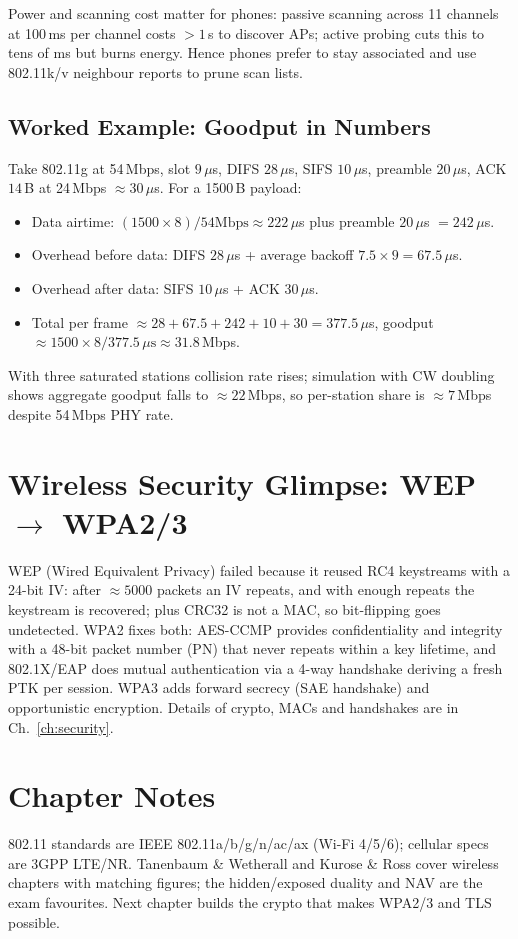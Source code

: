 Power and scanning cost matter for phones: passive scanning across 11 channels at 100\,ms per channel costs $>1$\,s to discover APs; active probing cuts this to tens of ms but burns energy. Hence phones prefer to stay associated and use 802.11k/v neighbour reports to prune scan lists.

\subsection{Worked Example: Goodput in Numbers}
Take 802.11g at 54\,Mbps, slot $9\,\mu$s, DIFS $28\,\mu$s, SIFS $10\,\mu$s, preamble $20\,\mu$s, ACK $14$\,B at 24\,Mbps $\approx 30\,\mu$s. For a 1500\,B payload:
\begin{itemize}[itemsep=0.25em]
    \item Data airtime: $(1500\times8)/54\text{Mbps}\approx 222\,\mu$s plus preamble $20\,\mu$s $=242\,\mu$s.
    \item Overhead before data: DIFS $28\,\mu$s + average backoff $7.5\times9=67.5\,\mu$s.
    \item Overhead after data: SIFS $10\,\mu$s + ACK $30\,\mu$s.
    \item Total per frame $\approx 28+67.5+242+10+30=377.5\,\mu$s, goodput $\approx 1500\times8/377.5\,\mu\text{s}\approx 31.8$\,Mbps.
\end{itemize}
With three saturated stations collision rate rises; simulation with CW doubling shows aggregate goodput falls to $\approx 22$\,Mbps, so per-station share is $\approx 7$\,Mbps despite 54\,Mbps PHY rate.

\section{Wireless Security Glimpse: WEP \texorpdfstring{$\to$}{to} WPA2/3}\label{sec:wireless-sec}
WEP (Wired Equivalent Privacy) failed because it reused RC4 keystreams with a 24-bit IV: after $\approx 5000$ packets an IV repeats, and with enough repeats the keystream is recovered; plus CRC32 is not a MAC, so bit-flipping goes undetected. WPA2 fixes both: AES-CCMP provides confidentiality and integrity with a 48-bit packet number (PN) that never repeats within a key lifetime, and 802.1X/EAP does mutual authentication via a 4-way handshake deriving a fresh PTK per session. WPA3 adds forward secrecy (SAE handshake) and opportunistic encryption. Details of crypto, MACs and handshakes are in Ch.~\ref{ch:security}.

\section{Chapter Notes}
802.11 standards are IEEE 802.11a/b/g/n/ac/ax (Wi-Fi 4/5/6); cellular specs are 3GPP LTE/NR. Tanenbaum \& Wetherall and Kurose \& Ross cover wireless chapters with matching figures; the hidden/exposed duality and NAV are the exam favourites. Next chapter builds the crypto that makes WPA2/3 and TLS possible.

